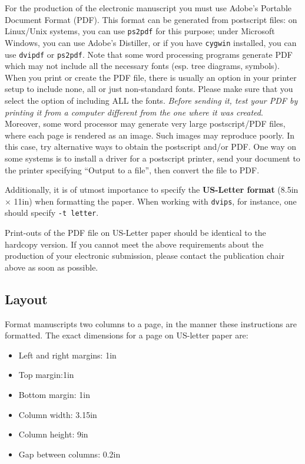 \documentclass[11pt]{article}
\begin{document}
For the production of the electronic manuscript you must use Adobe's
Portable Document Format (PDF). This format can be generated from
postscript files: on Linux/Unix systems, you can use {\tt ps2pdf} for this
purpose; under Microsoft Windows, you can use Adobe's Distiller, or
if you have {\tt cygwin} installed, you can use {\tt dvipdf} or
{\tt ps2pdf}.  Note
that some word processing programs generate PDF which may not include
all the necessary fonts (esp. tree diagrams, symbols). When you print
or create the PDF file, there is usually an option in your printer
setup to include none, all or just non-standard fonts.  Please make
sure that you select the option of including ALL the fonts.  {\em Before sending it, test your PDF by printing it from a computer different from the one where it was created}. Moreover,
some word processor may generate very large postscript/PDF files,
where each page is rendered as an image. Such images may reproduce
poorly.  In this case, try alternative ways to obtain the postscript
and/or PDF.  One way on some systems is to install a driver for a
postscript printer, send your document to the printer specifying
``Output to a file'', then convert the file to PDF.

Additionally, it is of utmost importance to specify the {\bf US-Letter format} (8.5in $\times$ 11in) when formatting the paper. When working with {\tt dvips}, for instance, one should specify {\tt -t letter}.

Print-outs of the PDF file on US-Letter paper should be identical to the
hardcopy version.  If you cannot meet the above requirements about the
production of your electronic submission, please contact the
publication chair above as soon as possible.


\subsection{Layout}
\label{ssec:layout}

Format manuscripts two columns to a page, in the manner these
instructions are formatted. The exact dimensions for a page on US-letter
paper are:

\begin{itemize}
\item Left and right margins: 1in
\item Top margin:1in
\item Bottom margin: 1in
\item Column width: 3.15in
\item Column height: 9in
\item Gap between columns: 0.2in
\end{itemize}
\end{document}
